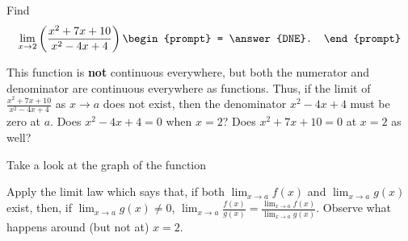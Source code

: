 \documentclass{ximera}
\author{Gregory Hartman \and Matthew Carr}
\begin{document}
\begin{exercise}




  Find 
  \[
  \lim_{x\to 2} \left({\frac{x^2+7x+10}{x^2-4x+4}}\right)
  \begin{prompt}
  = \answer{DNE}.
  \end{prompt}
  \]
    \begin{hint}
     This function is \textbf{not} continuous everywhere, but both the numerator and denominator are continuous everywhere as functions. Thus, if the limit of $\frac{x^2+7x+10}{x^2-4x+4}$ as $x\to{a}$ does not exist, then the denominator $x^2-4x+4$ must be zero at $a$. Does $x^2-4x+4=0$ when $x=2$? Does $x^2+7x+10=0$ at $x=2$ as well?
    \end{hint}
     \begin{hint}
    	Take a look at the graph of the function
    \begin{center}
      \end{center} 
      Apply the limit law which says that, if both $\lim_{x\to a}f(x)$ and $\lim_{x\to a}g(x)$ exist, then, if $\lim_{x\to a}g(x)\ne0$, $\lim_{x\to{a}}\frac{f(x)}{g(x)}=\frac{\lim_{x\to a}f(x)}{\lim_{x\to{a}}g(x)}$. Observe what happens around (but not at) $x=2$.
    \end{hint}
    \begin{hint}

\end{hint}
\end{exercise}
\end{document}
